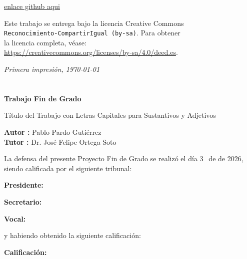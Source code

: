 \documentclass[
paper=a4,
fontsize=12pt,
oneside,
openright,                  %
titlepage,                  %
headsepline,                %
footheight=16pt,            %
parskip=half+,				%
numbers=noenddot,			%
headinclude=true,           %
footinclude=true,           %
cleardoublepage=empty,      %
captions=tableheading,      %
BCOR=5mm, 				    %
DIV=9   			        %
usegeometry=true			%
]{scrbook}
\begin{document}
    {\url{enlace github aqui}
    \medskip
    
    \par\noindent  Este trabajo se entrega bajo la licencia Creative Commons\\
    \texttt{Reconocimiento-CompartirIgual (by-sa)}. Para obtener\\
    la licencia completa, véase:\\
    \url{https://creativecommons.org/licenses/by-sa/4.0/deed.es}.
    \bigskip
    
    \par\noindent \textit{Primera impresión, \today}
\thispagestyle{empty}
    

\clearpage
{}
\chapter*{}

\vspace{-4cm}
\begin{center}
\LARGE
\textbf{Trabajo Fin de Grado}

\vspace{1cm}
\large
Título del Trabajo con Letras Capitales para Sustantivos y Adjetivos

\vspace{1cm}
\large
\textbf{Autor :} Pablo Pardo Gutiérrez  \\
\textbf{Tutor :} Dr. José Felipe Ortega Soto

\end{center}

\vspace{1cm}
La defensa del presente Proyecto Fin de Grado se realizó el día 3\qquad$\;\,$ de
\qquad\qquad\qquad\qquad \newline de 2026, siendo calificada por el siguiente tribunal:


\vspace{0.5cm}
\textbf{Presidente:}

\vspace{0.8cm}
\textbf{Secretario:}

\vspace{0.8cm}
\textbf{Vocal:}


\vspace{0.8cm}
y habiendo obtenido la siguiente calificación:

\vspace{0.8cm}
\textbf{Calificación:}


}
\end{document}
